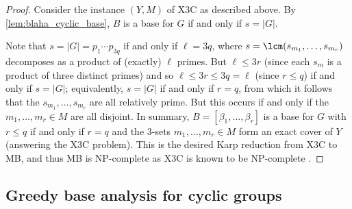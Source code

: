 \begin{proof}
    Consider the instance $(Y,M)$ of X3C as described above. By \autoref{lem:blaha_cyclic_base}, $B$ is a base for $G$ if and only if $s = |G|$.

    Note that $s = |G| = p_1 \dotsb p_{3q}$ if and only if $\ell = 3q$, where $s = \lcm(s_{m_1},\dotsc,s_{m_r})$ decomposes as a product of (exactly) $\ell$ primes. But $\ell \leq 3r$ (since each $s_m$ is a product of three distinct primes) and so $\ell \leq 3r \leq 3q = \ell$ (since $r \leq q$) if and only if $s = |G|$; equivalently, $s = |G|$ if and only if $r = q$, from which it follows that the $s_{m_1},\dotsc,s_{m_r}$ are all relatively prime. But this occurs if and only if the $m_1,\dotsc,m_r \in M$ are all disjoint. In summary, $B = [\beta_1,\dotsc,\beta_r]$ is a base for $G$ with $r \leq q$ if and only if $r = q$ and the 3-sets $m_1,\dotsc,m_r \in M$ form an exact cover of $Y$ (answering the X3C problem). This is the desired Karp reduction from X3C to MB, and thus MB is NP-complete as X3C is known to be NP-complete .
\end{proof}

\subsection{Greedy base analysis for cyclic groups}

